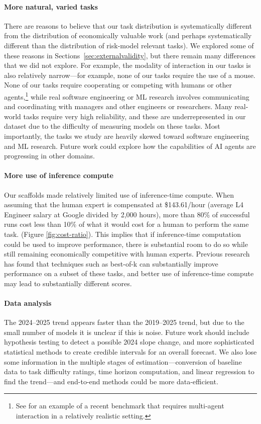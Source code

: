 \documentclass{article}
\begin{document}
\paragraph{More natural, varied tasks}
There are reasons to believe that our task distribution is systematically different from the distribution of economically valuable work (and perhaps systematically different than the distribution of risk-model relevant tasks). 
We explored some of these reasons in Sections~\ref{sec:externalvalidity}, but there remain many differences that we did not explore.
For example, the modality of interaction in our tasks is also relatively narrow---for example, none of our tasks require the use of a mouse. 
None of our tasks require cooperating or competing with humans or other agents,\footnote{See \citet{xu2024theagentcompany} for an example of a recent benchmark that requires multi-agent interaction in a relatively realistic setting.} while real software engineering or ML research involves communicating and coordinating with managers and other engineers or researchers. Many real-world tasks require very high reliability, and these are underrepresented in our dataset due to the difficulty of measuring models on these tasks.
Most importantly, the tasks we study are heavily skewed toward software engineering and ML research. 
Future work could explore how the capabilities of AI agents are progressing in other domains. 

\paragraph{More use of inference compute} Our scaffolds made relatively limited use of inference-time compute. When assuming that the human expert is compensated at \$143.61/hour (average L4 Engineer salary at Google divided by 2,000 hours), more than 80\% of successful runs cost less than 10\% of what it would cost for a human to perform the same task. (Figure \ref{fig:cost-ratio}). This implies that if inference-time computation could be used to improve performance, there is substantial room to do so while still remaining economically competitive with human experts. Previous research has found that techniques such as best-of-k can substantially improve performance on a subset of these tasks,\cite{wijk2024re} and better use of inference-time compute may lead to substantially different scores. 

\paragraph{Data analysis} The 2024--2025 trend appears faster than the 2019--2025 trend, but due to the small number of models it is unclear if this is noise. Future work should include hypothesis testing to detect a possible 2024 slope change, and more sophisticated statistical methods to create credible intervals for an overall forecast. We also lose some information in the multiple stages of estimation---conversion of baseline data to task difficulty ratings, time horizon computation, and linear regression to find the trend---and end-to-end methods could be more data-efficient.
\end{document}

